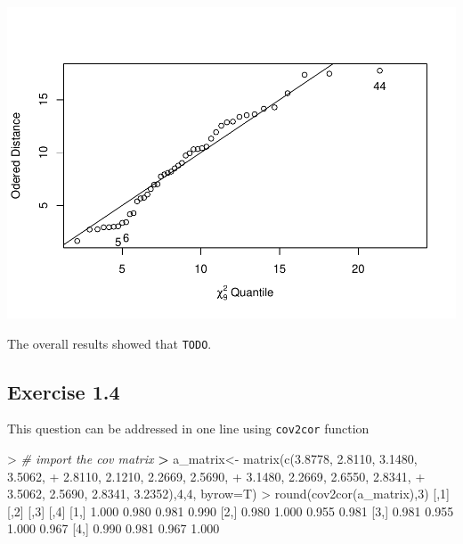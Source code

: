 \documentclass[
]{article}
\newenvironment{Shaded}{\begin{snugshade}}{\end{snugshade}}
\newcommand{\AttributeTok}[1]{\textcolor[rgb]{0.77,0.63,0.00}{#1}}
\newcommand{\CommentTok}[1]{\textcolor[rgb]{0.56,0.35,0.01}{\textit{#1}}}
\newcommand{\DecValTok}[1]{\textcolor[rgb]{0.00,0.00,0.81}{#1}}
\newcommand{\ErrorTok}[1]{\textcolor[rgb]{0.64,0.00,0.00}{\textbf{#1}}}
\newcommand{\FloatTok}[1]{\textcolor[rgb]{0.00,0.00,0.81}{#1}}
\newcommand{\FunctionTok}[1]{\textcolor[rgb]{0.00,0.00,0.00}{#1}}
\newcommand{\NormalTok}[1]{#1}
\newcommand{\OtherTok}[1]{\textcolor[rgb]{0.56,0.35,0.01}{#1}}
\newcommand{\SpecialCharTok}[1]{\textcolor[rgb]{0.00,0.00,0.00}{#1}}
\begin{document}
\includegraphics[width=0.5\linewidth,height=0.5\textheight]{hudm6122_hw_01_ChenguangPan_files/figure-latex/unnamed-chunk-4-1}

The overall results showed that \texttt{TODO}.

\hypertarget{exercise-1.4}{%
\subsection{Exercise 1.4}\label{exercise-1.4}}

This question can be addressed in one line using \texttt{cov2cor}
function

\begin{Shaded}
\begin{Highlighting}[]
\SpecialCharTok{\textgreater{}} \CommentTok{\# import the cov matrix}
\ErrorTok{\textgreater{}}\NormalTok{ a\_matrix}\OtherTok{\textless{}{-}} \FunctionTok{matrix}\NormalTok{(}\FunctionTok{c}\NormalTok{(}\FloatTok{3.8778}\NormalTok{, }\FloatTok{2.8110}\NormalTok{, }\FloatTok{3.1480}\NormalTok{, }\FloatTok{3.5062}\NormalTok{,}
\SpecialCharTok{+}                     \FloatTok{2.8110}\NormalTok{, }\FloatTok{2.1210}\NormalTok{, }\FloatTok{2.2669}\NormalTok{, }\FloatTok{2.5690}\NormalTok{,}
\SpecialCharTok{+}                     \FloatTok{3.1480}\NormalTok{, }\FloatTok{2.2669}\NormalTok{, }\FloatTok{2.6550}\NormalTok{, }\FloatTok{2.8341}\NormalTok{,}
\SpecialCharTok{+}                     \FloatTok{3.5062}\NormalTok{, }\FloatTok{2.5690}\NormalTok{, }\FloatTok{2.8341}\NormalTok{, }\FloatTok{3.2352}\NormalTok{),}\DecValTok{4}\NormalTok{,}\DecValTok{4}\NormalTok{, }\AttributeTok{byrow=}\NormalTok{T)}
\SpecialCharTok{\textgreater{}} \FunctionTok{round}\NormalTok{(}\FunctionTok{cov2cor}\NormalTok{(a\_matrix),}\DecValTok{3}\NormalTok{)}
\NormalTok{      [,}\DecValTok{1}\NormalTok{]  [,}\DecValTok{2}\NormalTok{]  [,}\DecValTok{3}\NormalTok{]  [,}\DecValTok{4}\NormalTok{]}
\NormalTok{[}\DecValTok{1}\NormalTok{,] }\FloatTok{1.000} \FloatTok{0.980} \FloatTok{0.981} \FloatTok{0.990}
\NormalTok{[}\DecValTok{2}\NormalTok{,] }\FloatTok{0.980} \FloatTok{1.000} \FloatTok{0.955} \FloatTok{0.981}
\NormalTok{[}\DecValTok{3}\NormalTok{,] }\FloatTok{0.981} \FloatTok{0.955} \FloatTok{1.000} \FloatTok{0.967}
\NormalTok{[}\DecValTok{4}\NormalTok{,] }\FloatTok{0.990} \FloatTok{0.981} \FloatTok{0.967} \FloatTok{1.000}
\end{Highlighting}
\end{Shaded}
\end{document}
